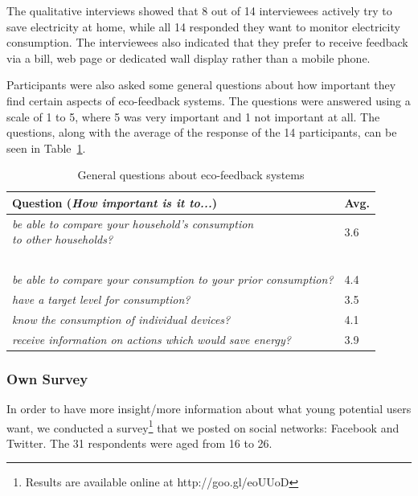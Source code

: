 \documentclass[journal]{vgtc}                %
\begin{document}
The qualitative interviews showed that 8 out of 14 interviewees actively try to save electricity at home, while all 14 responded they want to monitor electricity consumption. The interviewees also indicated that they prefer to receive feedback via a bill, web page or dedicated wall display rather than a mobile phone.

Participants were also asked some general questions about how important they find certain aspects of eco-feedback systems. The questions were answered using a scale of 1 to 5, where 5 was very important and 1 not important at all. The questions, along with the average of the response of the 14 participants, can be seen in Table~\ref{prototypesquestions}.

\begin{table}
  \caption{General questions about eco-feedback systems  \cite{karjalainen2011consumer}}
  \label{prototypesquestions}
  \scriptsize
  \begin{center}
    \begin{tabular}{|ll|}
    \hline
       Question (\textit{How important is it to...}) & Avg. \\ \hline
       \pbox{20cm}{\textit{be able to compare your household's consumption}\\\textit{to other households?}} & 3.6 \\ ~\\[-0.25cm]
       \textit{be able to compare your consumption to your prior consumption?} & 4.4 \\ 
       \textit{have a target level for consumption?} & 3.5 \\ 
       \textit{know the consumption of individual devices?} & 4.1 \\ 
       \textit{receive information on actions which would save energy?} & 3.9 \\
       \hline
    \end{tabular}
  \end{center}
\end{table}

\subsubsection{Own Survey}
In order to have more insight/more information about what young potential users want, we conducted a survey\footnote{Results are available online at {http://goo.gl/eoUUoD}} that we posted on social networks: Facebook and Twitter.
The 31 respondents were aged from 16 to 26.%
\end{document}
